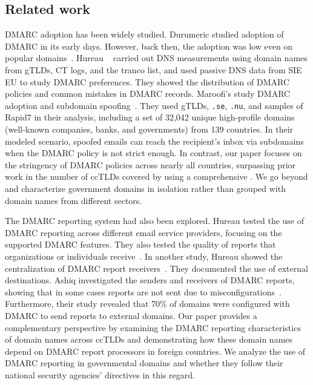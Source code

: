 \subsection{Related work}
\gls{DMARC} adoption has been widely studied.
Durumeric \etal studied adoption of \gls{DMARC} in its early days. However, back then, the adoption was low even on popular domains~\cite{zakir2015}.
Hureau \etal~\cite{hureau_spoofed} carried out \gls{DNS} measurements using domain names from \glspl{gTLD}, \gls{CT} logs, and the tranco list, and used passive DNS data from SIE EU to study \gls{DMARC} preferences.
They showed the distribution of \gls{DMARC} policies and common mistakes in \gls{DMARC} records.%
Maroofi's \etal study \gls{DMARC} adoption and subdomain spoofing~\cite{MaroofiEtAl_AdoptionEmailAntiSpoofing_2021}.
They used \glspl{gTLD}, \texttt{.se}, \texttt{.nu}, and samples of Rapid7 in their analysis, including a set of 32,042 unique high-profile domains (well-known companies, banks, and governments) from 139 countries.
In their modeled scenario, spoofed emails can reach the recipient's inbox via subdomains when the \gls{DMARC} policy is not strict enough.
In contrast, our paper focuses on the stringency of \gls{DMARC} policies across nearly all countries, surpassing prior work in the number of \glspl{ccTLD} covered by using a comprehensive \dataset. We go beyond and characterize government domains in isolation rather than grouped with domain names from different sectors.

The \gls{DMARC} reporting system had also been explored.
Hureau \etal tested the use of \gls{DMARC} reporting across different email service providers, focusing on the supported \gls{DMARC} features. They also tested the quality of reports that organizations or individuals receive~\cite{hureau_stress_testing}.
In another study, Hureau \etal showed the centralization of \gls{DMARC} report receivers~\cite{hureau_spoofed}. They documented the use of external destinations.
Ashiq \etal investigated the senders and receivers of \gls{DMARC} reports, showing that in some cases reports are not sent due to misconfigurations~\cite{ashiq2023}. Furthermore, their study revealed that 70\% of domains were configured with \gls{DMARC} to send reports to external domains.
Our paper provides a complementary perspective by examining the \gls{DMARC} reporting characteristics of domain names across \glspl{ccTLD} and demonstrating how these domain names depend on \gls{DMARC} report processors in foreign countries.
We analyze the use of \gls{DMARC} reporting in governmental domains and whether they follow their national security agencies' directives in this regard.
